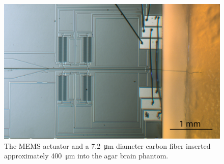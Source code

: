 \begin{figure}[t]
\centering
\includegraphics[width=\columnwidth]{images/CompositeFin.png}
\caption{The MEMS actuator and a \SI{7.2}{\micro\meter} diameter carbon fiber inserted approximately \SI{400}{\micro\meter} into the agar brain phantom.}
\label{fig:agar-push-composite}
\end{figure}

    
    